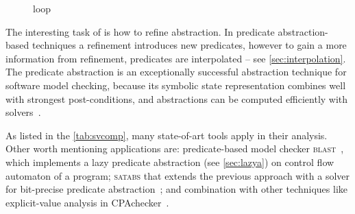 \begin{figure}[h]
\caption{\cegar loop}
\label{fig:cegar}
\end{figure}

The interesting task of \cegar is how to refine abstraction. In predicate
abstraction-based techniques a refinement introduces new predicates, however to
gain a more information from refinement, predicates are interpolated
\cite{Jhala2006} -- see \autoref{sec:interpolation}. The predicate abstraction
is an exceptionally successful abstraction technique for software model
checking, because its symbolic state representation combines well with
strongest post-conditions, and abstractions can be computed efficiently with
\smt solvers~\cite{Beyer2013}.

As listed in the \autoref{tab:svcomp}, many state-of-art tools apply \cegar in
their analysis. Other worth mentioning applications are: predicate-based model
checker \textsc{blast}~\cite{Henzinger2003, Beyer2005checking}, which
implements a lazy predicate abstraction (see \autoref{sec:lazya}) on control
flow automaton of a program; \textsc{satabs} that extends the previous approach
with a \sat solver for bit-precise predicate abstraction~\cite{Clarke2005satabs};
and combination with other techniques like explicit-value analysis in
CPAchecker~\cite{Beyer2013, Beyer2018e}.

